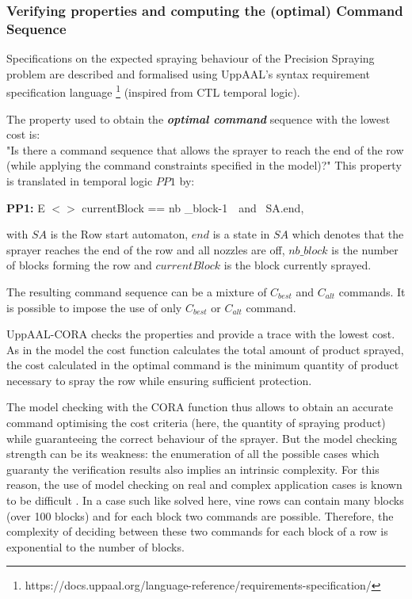 \documentclass[preprint,3p,times,twocolumn]{elsarticle}
\begin{document}
\subsubsection{Verifying properties and computing the (optimal) Command Sequence}
\label{sec:VerifProp}

Specifications on the expected spraying behaviour of the Precision Spraying problem are described and formalised using UppAAL's syntax requirement specification language \footnote{https://docs.uppaal.org/language-reference/requirements-specification/} (inspired from CTL temporal logic).  

The property used to obtain the \textit{\textbf{optimal command}} sequence with the lowest cost is: \\
"Is there a command sequence that allows the sprayer to reach the end of the row (while applying the command constraints specified in the model)?" 
This property is translated in temporal logic $PP1$ by:

\textbf{PP1:} E $<>$ currentBlock == nb \_block-1\ \ and \ SA.end, 

with $SA$ is the Row start automaton, $end$ is a state in $SA$ which denotes that the sprayer reaches the end of the row and all nozzles are off, $ nb\_block$ is the number of blocks forming the row and $currentBlock$ is the block currently sprayed.

The resulting command sequence can be a mixture of $C_{best}$ and $C_{alt}$ commands. It is possible to impose the use of only $C_{best}$ or $C_{alt}$ command.



UppAAL-CORA checks the properties and provide a trace with the lowest cost. As in the model the cost function calculates the total amount of product sprayed, the cost calculated in the optimal command is the minimum quantity of product necessary to spray the row while ensuring sufficient protection.


The model checking with the CORA function thus allows to obtain an accurate command optimising the cost criteria (here, the quantity of spraying product) while guaranteeing the correct behaviour of the sprayer. But the model checking strength can be its weakness: the enumeration of all the possible cases which guaranty the verification results also implies an intrinsic complexity. For this reason, the use of model checking on real and complex application cases is known to be difficult \cite{D2.3}. In a case such like solved here, vine rows can contain many blocks (over 100 blocks) and for each block two commands are possible. Therefore, the complexity of deciding between these two commands for each block of a row is exponential to the number of blocks.
\end{document}
